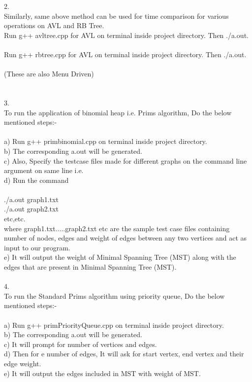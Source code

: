 \documentclass[10pt,a4paper]{article} ,
\begin{document}
2. \\Similarly, same above method can be used for time comparison for various operations on AVL and RB Tree.\\ 
Run g++ avltree.cpp for AVL on terminal inside project directory. Then ./a.out.\\ \\ 
Run g++ rbtree.cpp for AVL on terminal inside project directory. Then ./a.out.\\ \\ 
(These are also Menu Driven) \\ \\ \\

3. \\To run the application of binomial heap i.e. Prims algorithm, Do the below mentioned steps:- \\ \\a) Run g++ primbinomial.cpp on terminal inside project directory.\\
b) The corresponding a.out will be generated. \\
c) Also, Specify the testcase files made for different graphs on the command line argument on same line i.e. \\
d) Run the command\\ \\
./a.out graph1.txt\\
./a.out graph2.txt\\ etc,etc. \\

where graph1.txt.....graph2.txt etc are the sample test case files containing number of nodes, edges and weight of edges between any two vertices and act as input to our program. \\

e) It will output the weight of Minimal Spanning Tree (MST) along with the edges that are present in Minimal Spanning Tree (MST). \\ \\

4. \\To run the Standard Prims algorithm using priority queue, Do the below mentioned steps:- \\ \\a) Run g++ primPriorityQueue.cpp on terminal inside project directory.\\
b) The corresponding a.out will be generated. \\
c) It will prompt for number of vertices and edges. \\
d) Then for e number of edges, It will ask for start vertex, end vertex and their edge weight. \\
e) It will output the edges included in MST with weight of MST.\\ \\
\end{document}

